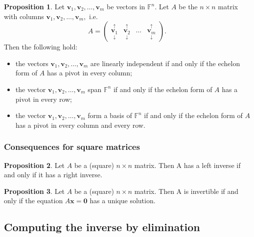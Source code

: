 \documentclass[12pt, a4paper]{article}
\theoremstyle{definition}
\newtheorem{proposition}{Proposition}
\theoremstyle{plain}
\newcommand{\bb}[1]{\mathbb{#1}}
\newcommand{\vect}[1]{\mathbf{#1}}
\begin{document}
\begin{proposition} Let $\vect{v}_1,\vect{v}_2,\ldots,\vect{v}_m$ be vectors in $\bb{F}^n.$ Let $A$ be the $n\times n$ matrix with columns $\vect{v}_1,\vect{v}_2,\ldots,\vect{v}_m,$ i.e. 
$$A=\begin{pmatrix}  
\underset{\downarrow}{\overset{\uparrow}{\vect{v}_1}} & \underset{\downarrow}{\overset{\uparrow}{\vect{v}_2}} & \ldots & \underset{\downarrow}{\overset{\uparrow}{\vect{v}_m}}
\end{pmatrix}.$$ Then the following hold:

\begin{itemize}

	\item the vectors $\vect{v}_1,\vect{v}_2,\ldots,\vect{v}_m$ are linearly independent if and only if the echelon form of $A$ has a pivot in every column;

	\item the vector $\vect{v}_1,\vect{v}_2,\ldots,\vect{v}_m$ span $\bb{F}^n$ if and only if the echelon form of $A$ has a pivot in every row;

	\item the vector $\vect{v}_1,\vect{v}_2,\ldots,\vect{v}_m$ form a basis of $\bb{F}^n$ if and only if the echelon form of $A$ has a pivot in every column and every row.

\end{itemize}
\end{proposition}

\subsubsection{Consequences for square matrices}

\begin{proposition} Let $A$ be a (square) $n \times n$ matrix. Then A has a left inverse if and only if it has a right inverse. \end{proposition}

\begin{proposition} Let $A$ be a (square) $n\times n$ matrix. Then A is invertible if and only if the equation $A\vect{x} = \vect{0}$ has a unique solution. \end{proposition}

\subsection{Computing the inverse by elimination}
\end{document}
